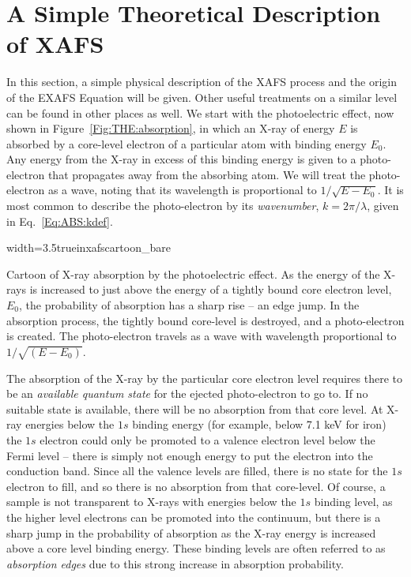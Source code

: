 \section{A Simple Theoretical Description of XAFS}{\label{Sect:theory}}

In this section, a simple physical description of the XAFS process and the
origin of the EXAFS Equation will be given.  Other useful treatments on a
similar level can be found in other
places\cite{Stern1988,RehrAlbersRMP2000} as well.  We start with the
photoelectric effect, now shown in Figure~\ref{Fig:THE:absorption}, in
which an X-ray of energy $E$ is absorbed by a core-level electron of a
particular atom with binding energy $E_0$.  Any energy from the X-ray in
excess of this binding energy is given to a photo-electron that propagates
away from the absorbing atom.  We will treat the photo-electron as a wave,
noting that its wavelength is proportional to $1/\sqrt{E-E_0}$.  It is most
common to describe the photo-electron by its {\emph{wavenumber}}, $k =
2\pi/\lambda$, given in Eq.~\ref{Eq:ABS:kdef}.

\begin{Nfig}{width=3.5truein}{xafscartoon_bare}
  \caption{Cartoon of X-ray absorption by the photoelectric effect.  As the
    energy of the X-rays is increased to just above the energy of a tightly
    bound core electron level, $E_0$, the probability of absorption has a
    sharp rise -- an edge jump.  In the absorption process, the tightly
    bound core-level is destroyed, and a photo-electron is created. The
    photo-electron travels as a wave with wavelength proportional to
    $1/\sqrt{(E-E_0)}$.}
  \label{Fig:THE:absorption}
\end{Nfig}


The absorption of the X-ray by the particular core electron level requires
there to be an \emph{available quantum state} for the ejected
photo-electron to go to.  If no suitable state is available, there will be
no absorption from that core level.  At X-ray energies below the $1s$
binding energy (for example, below 7.1 keV for iron) the $1s$ electron
could only be promoted to a valence electron level below the Fermi level --
there is simply not enough energy to put the electron into the conduction
band.  Since all the valence levels are filled, there is no state for the
$1s$ electron to fill, and so there is no absorption from that core-level.
Of course, a sample is not transparent to X-rays with energies below the
$1s$ binding level, as the higher level electrons can be promoted into the
continuum, but there is a sharp jump in the probability of absorption as
the X-ray energy is increased above a core level binding energy.  These
binding levels are often referred to as {\emph{ absorption edges}} due to
this strong increase in absorption probability.

